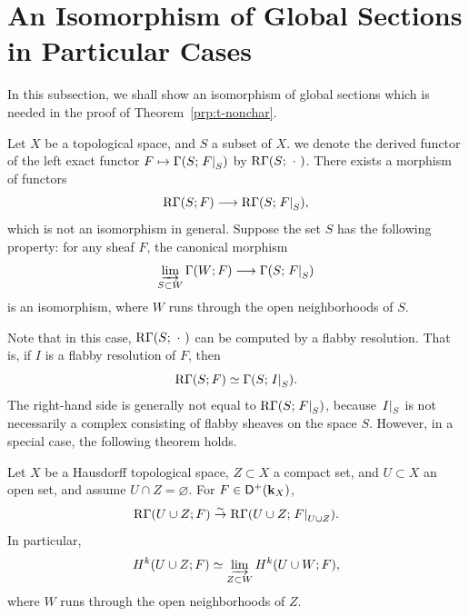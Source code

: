 

\appendix
\section{An Isomorphism of Global Sections in Particular Cases}\label{sec:special-isom}
In this subsection, we shall show 
an isomorphism of global sections 
which is needed in the proof of Theorem~\ref{prp:t-nonchar}.

Let \(X\) be a topological space, 
and \(S\) a subset of \(X\). 
we denote the derived functor of 
the left exact functor \(F \mapsto \Gamma(S; \mres[F]{S})\)
by \(\RG(S; \blk)\). 
There exists a morphism of functors
\[
  \RG(S; F) \longrightarrow \RG(S; \mres[F]{S}),
\]
which is not an isomorphism in general. Suppose the set \(S\) has the following property: for any sheaf \(F\), the canonical morphism
\[
  \indlim[S \subset W] \Gamma(W; F) \longrightarrow \Gamma(S; \mres[F]{S})
\]
is an isomorphism, where \(W\) runs through the open neighborhoods of \(S\).

Note that in this case, \(\RG(S; \blk)\) can be computed by a flabby resolution. That is, if \(I\) is a flabby resolution of \(F\), then
\[
  \RG(S; F) \simeq \Gamma(S; \mres[I]{S}).
\]
The right-hand side is generally not equal to \(\RG(S; \mres[F]{S})\), because \(\mres[I]{S}\) is not necessarily a complex consisting of flabby sheaves on the space \(S\). However, in a special case, the following theorem holds.

\begin{Lemma+}\label{lmm:special-isom}
  Let \(X\) be a Hausdorff topological space, \(Z \subset X\) a compact set, and \(U \subset X\) an open set, and assume \(U \cap Z = \varnothing\). For \(F \in \Dompl(\kk_X)\),
  \[
    \RG(U \cup Z; F) \simar \RG(U \cup Z; \mres[F]{U \cup Z}).
  \]
  In particular,
  \[
    H^k(U \cup Z; F) \simeq \indlim[Z \subset W] H^k(U \cup W; F),
  \]
  where \(W\) runs through the open neighborhoods of \(Z\).
\end{Lemma+}

